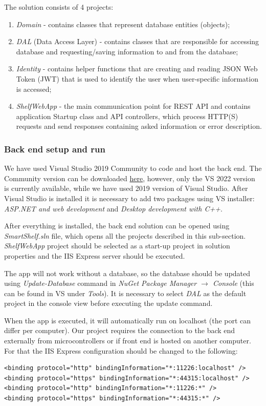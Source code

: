 \documentclass{article}
\begin{document}
The solution consists of 4 projects:
\begin{enumerate}
    \item \textit{Domain} - contains classes that represent database entities (objects);
    \item \textit{DAL} (Data Access Layer) - contains classes that are responsible for accessing database and requesting/saving information to and from the database;
    \item \textit{Identity} - contains helper functions that are creating and reading JSON Web Token (JWT) that is used to identify the user when user-specific information is accessed;
    \item \textit{ShelfWebApp} - the main communication point for REST API and contains application Startup class and API controllers, which process HTTP(S) requests and send responses containing asked information or error description.
\end{enumerate}


\subsubsection{Back end setup and run}
We have used Visual Studio 2019 Community to code and host the back end. The Community version can be downloaded \href{https://visualstudio.microsoft.com/vs/community/}{here}, however, only the VS 2022 version is currently available, while we have used 2019 version of Visual Studio. After Visual Studio is installed it is necessary to add two packages using VS installer: \textit{ASP.NET and web development} and \textit{Desktop development with C++}.

After everything is installed, the back end solution can be opened using \textit{SmartShelf.sln} file, which opens all the projects described in this sub-section. \textit{ShelfWebApp} project should be selected as a start-up project in solution properties and the IIS Express server should be executed. 

The app will not work without a database, so the database should be updated using \textit{Update-Database} command in \textit{NuGet Package Manager $\rightarrow$ Console} (this can be found in VS under \textit{Tools}). It is necessary to select \textit{DAL} as the default project in the console view before executing the update command. 

When the app is executed, it will automatically run on localhost (the port can differ per computer). Our project requires the connection to the back end externally from microcontrollers or if front end is hosted on another computer. For that the IIS Express configuration should be changed to the following: 
\begin{lstlisting}
<binding protocol="http" bindingInformation="*:11226:localhost" />
<binding protocol="https" bindingInformation="*:44315:localhost" />
<binding protocol="http" bindingInformation="*:11226:*" />
<binding protocol="https" bindingInformation="*:44315:*" />
\end{lstlisting}
\end{document}
